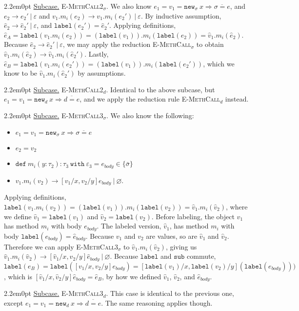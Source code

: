 \documentclass{llncs}
\newcommand{\keywadj}[1]{\mathtt{#1}}
\newcommand{\keyw}[1]{\keywadj{#1}~}
\newcommand{\kwa}[1]{\keywadj{ #1 }}
\newcommand{\subcase}[1] {
	\begin{adjustwidth}{2.2em}{0pt}
		\underline{Subcase.} #1
	\end{adjustwidth}
}
\newcommand{\type}[2]{
	#1~\keyw{with} #2
}
\newcommand{\newd}[0]{
	\keywadj{new}_d~x \Rightarrow \overline{d = e}
}
\newcommand{\newsig}[0]{
	\keywadj{new}_\sigma~x \Rightarrow \overline{\sigma = e}
}
\begin{document}
{{{}

\subcase{ \textsc{E-MethCall2$_\sigma$}. We also know $e_1 = v_1 = \newsig$, and $e_2 \longrightarrow e_2'~|~\varepsilon$ and $v_1.m_i(e_2) \longrightarrow v_1.m_i(e_2')~|~\varepsilon$. By inductive assumption, $\hat e_2 \longrightarrow \hat e_2'~|~\varepsilon$, and $\keywadj{label}(e_2') = \hat e_2'$. Applying definitions, $\hat e_A = \keywadj{label}(v_1.m_i(e_2)) = (\keywadj{label}(v_1)).m_i(\keywadj{label}(e_2)) = \hat v_1.m_i(\hat e_2)$. Because $\hat e_2 \longrightarrow \hat e_2'~|~\varepsilon$, we may apply the reduction \textsc{E-MethCall$_\sigma$} to obtain $\hat v_1.m_i(\hat e_2) \longrightarrow \hat v_1.m_i(\hat e_2')$. Lastly, $\hat e_B = \keywadj{label}(v_1.m_i(e_2')) = (\keywadj{label}(v_1)).m_i(\keywadj{label}(e_2'))$, which we know to be $\hat v_1.m_i(\hat e_2')$ by assumptions. \\
}

\subcase{ \textsc{E-MethCall2$_d$}. Identical to the above subcase, but $e_1 = v_1 = \newd$, and we apply the reduction rule \textsc{E-MethCall$_d$} instead. 
\\}


\subcase{ \textsc{E-MethCall3$_\sigma$}. We also know the following:
\begin{itemize}
	\item $e_1 = v_1 = \newsig$
	\item $e_2 = v_2$
	\item $\keywadj{def~} m_i(y : \tau_2) : \type{\tau_3}{\varepsilon_3} = e_{body} \in \{ \bar \sigma \}$
	\item $v_1.m_i(v_2) \longrightarrow [v_1/x, v_2/y]e_{body}~|~\varnothing$.
\end{itemize}
\noindent
Applying definitions, $\keywadj{label}(v_1.m_i(v_2)) = (\keywadj{label}(v_1)).m_i(\keywadj{label}(v_2)) = \hat v_1.m_i(\hat v_2)$, where we define $\hat v_1 = \kwa{label}(v_1)$ and $\hat v_2 = \kwa{label}(v_2)$. Before labeling, the object $v_1$ has method $m_i$ with body $e_{body}$. The labeled version, $\hat v_1$, has method $m_i$ with body $\keywadj{label}(e_{body}) = \hat e_{body}$. Because $v_1$ and $v_2$ are values, so are $\hat v_1$ and $\hat v_2$. Therefore we can apply \textsc{E-MethCall3$_\sigma$} to $\hat v_1.m_i(\hat v_2)$, giving us $\hat v_1.m_i(\hat v_2) \longrightarrow [\hat v_1 / x, \hat v_2 / y]\hat e_{body}~|~\varnothing$. Because $\keywadj{label}$ and $\keywadj{sub}$ commute, $\keywadj{label}(e_B) = \keywadj{label}([v_1/x, v_2/y]e_{body}) = [\keywadj{label}(v_1)/x, \keywadj{label}(v_2)/y](\keywadj{label}(e_{body})))$, which is $[\hat v_1/x, \hat v_2/y] \hat e_{body} = \hat e_B$, by how we defined $\hat v_1$, $\hat v_2$, and $\hat e_{body}$.\\
}


\subcase{ \textsc{E-MethCall3$_d$}.
This case is identical to the previous one, except $e_1 = v_1 = \newd$. The same reasoning applies though.
}

}~\\
}
\end{document}
